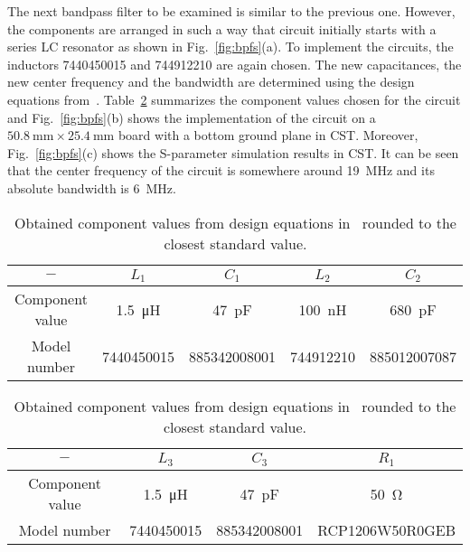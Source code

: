The next bandpass filter to be examined is similar to the previous one. However, the components are arranged in such a way that circuit initially starts with a series LC resonator as shown in Fig.~\ref{fig:bpfs}(a). To implement the circuits, the inductors 7440450015 and 744912210 are again chosen. The new capacitances, the new center frequency and the bandwidth are determined using the design equations from~\cite{lam}. Table~\ref{tab:bpfs_val} summarizes the component values chosen for the circuit and Fig.~\ref{fig:bpfs}(b) shows the implementation of the circuit on a $\SI{50.8}{\milli\meter} \times \SI{25.4}{\milli\meter}$ board with a bottom ground plane in CST. Moreover, Fig.~\ref{fig:bpfs}(c) shows the S-parameter simulation results in CST. It can be seen that the center frequency of the circuit is somewhere around \SI{19}{\mega\hertz} and its absolute bandwidth is \SI{6}{\mega\hertz}.
\begin{table}[ptbh]
	\centering
	\begin{tabular}{|c|c c c c|}
		\hline
		$-$ & $L_1$ & $C_1$ & $L_2$ & $C_2$ \\
		\hline
		Component value & \SI{1.5}{\micro\henry} & \SI{47}{\pico\farad} & \SI{100}{\nano\henry} & \SI{680}{\pico\farad}\\
		Model number & 7440450015 & 885342008001 & 744912210 & 885012007087\\
		\hline
	\end{tabular} 
	\begin{tabular}{|c|c c c|}
		\hline
		$-$ & $L_3$ & $C_3$ & $R_1$\\
		\hline
		Component value & \SI{1.5}{\micro\henry} & \SI{47}{\pico\farad} & \SI{50}{\ohm}\\
		Model number & 7440450015 & 885342008001 & RCP1206W50R0GEB\\
		\hline
	\end{tabular}
	\caption{Obtained component values from design equations in~\cite{lam} rounded to the closest standard value.}
	\label{tab:bpfs_val}
\end{table}
